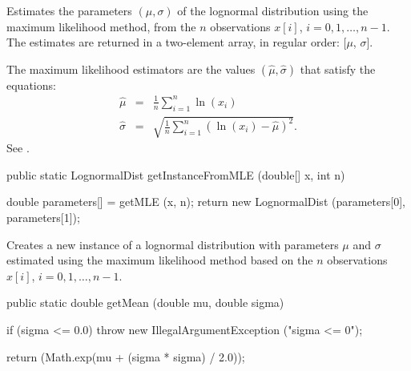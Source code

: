 \begin{tabb}
   Estimates the parameters $(\mu, \sigma)$ of the lognormal distribution
   using the maximum likelihood method, from the $n$ observations
   $x[i]$, $i = 0, 1,\ldots, n-1$. The estimates are returned in a two-element
    array, in regular order: [$\mu$, $\sigma$].
   \begin{detailed}
   The maximum likelihood estimators are the values $(\hat\mu , \hat\sigma)$
   that satisfy the equations:
   \begin{eqnarray*}
      \hat{\mu} & = & \frac{1}{n} \sum_{i=1}^{n} \ln(x_i)\\[6pt]
      \hat{\sigma} & = & \sqrt{\frac{1}{n} \sum_{i=1}^{n} (\ln(x_i) - \hat{\mu})^2}.
   \end{eqnarray*}
   See \cite[page 220]{tJOH95a}.
   \end{detailed}
\end{tabb}
\begin{htmlonly}
\end{htmlonly}
\begin{code}

   public static LognormalDist getInstanceFromMLE (double[] x, int n)\begin{hide} {
      double parameters[] = getMLE (x, n);
      return new LognormalDist (parameters[0], parameters[1]);
   }\end{hide}
\end{code}
\begin{tabb}
   Creates a new instance of a lognormal distribution with parameters $\mu$ and $\sigma$
   estimated using the maximum likelihood method based on the $n$ observations
   $x[i]$, $i = 0, 1, \ldots, n-1$.
\end{tabb}
\begin{htmlonly}
\end{htmlonly}
\begin{code}

   public static double getMean (double mu, double sigma)\begin{hide} {
      if (sigma <= 0.0)
         throw new IllegalArgumentException ("sigma <= 0");

      return (Math.exp(mu + (sigma * sigma) / 2.0));
   }\end{hide}
\end{code}
